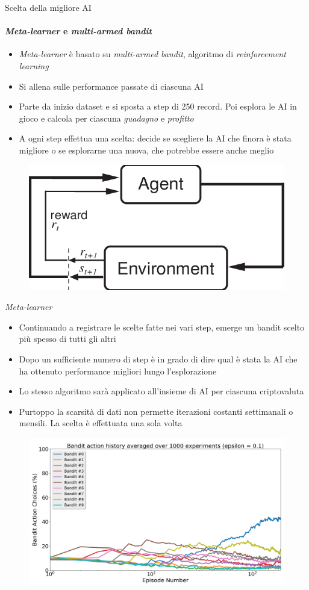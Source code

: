 \documentclass{beamer}
\begin{document}
\begin{frame}{Scelta della migliore AI}
\framesubtitle{\textit{Meta-learner} e \textit{multi-armed bandit}}
\begin{itemize}
\item \textit{Meta-learner} è basato su \textit{multi-armed bandit}, algoritmo di \textit{reinforcement learning}
\item Si allena sulle performance passate di ciascuna AI
\item Parte da inizio dataset e si sposta a step di 250 record. Poi esplora le AI in gioco e calcola per ciascuna \textit{guadagno} e \textit{profitto}
\item A ogni step effettua una scelta: decide se scegliere la AI che finora è stata migliore o se esplorarne una nuova, che potrebbe essere anche meglio
\end{itemize}
\begin{figure}
        \centering
        \includegraphics[width=.45\linewidth]{rl}
    \end{figure}
\end{frame}

\begin{frame}{\textit{Meta-learner}}
\begin{itemize}
\item Continuando a registrare le scelte fatte nei vari step, emerge un bandit scelto più spesso di tutti gli altri
\item Dopo un sufficiente numero di step è in grado di dire qual è stata la AI che ha ottenuto performance migliori lungo l'esplorazione
\item Lo stesso algoritmo sarà applicato all'insieme di AI per ciascuna criptovaluta
\item Purtoppo la scarsità di dati non permette iterazioni costanti settimanali o mensili. La scelta è effettuata una sola volta
\end{itemize}
\begin{figure}
        \centering
        \includegraphics[width=.5\linewidth]{bandit_choice_1000}
\end{figure}
\end{frame}
\end{document}
